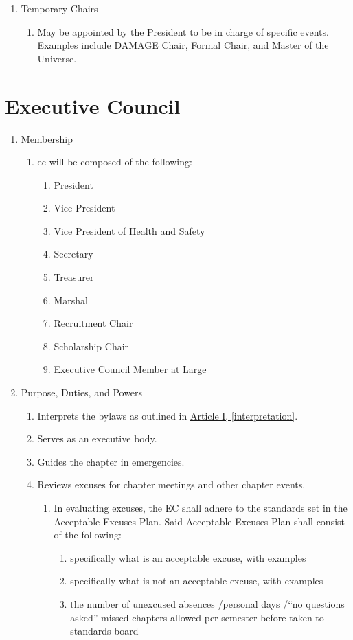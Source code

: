 \begin{enumerate}
		\item Temporary Chairs
			\begin{enumerate}
				\item May be appointed by the President to be in charge of specific events. Examples include DAMAGE Chair, Formal Chair, and Master of the Universe.
			\end{enumerate}

\end{enumerate}

\section{Executive Council}
	\begin{enumerate}
		\item Membership
			\begin{enumerate}
				\item \Gls{ec} will be composed of the following:
					\begin{enumerate}
						\item President
						\item Vice President
						\item Vice President of Health and Safety
						\item Secretary
						\item Treasurer
						\item Marshal
						\item Recruitment Chair
                        			\item Scholarship Chair
						\item Executive Council Member at Large
					\end{enumerate}

			\end{enumerate}

		\item Purpose, Duties, and Powers
			\begin{enumerate}
				\item Interprets the bylaws as outlined in \hyperref[interpretation]{Article I, \autoref*{interpretation}}.
				\item Serves as an executive body.
				\item Guides the chapter in emergencies.
				\item Reviews excuses for chapter meetings and other chapter events.
					\begin{enumerate}
					\item In evaluating excuses, the EC shall adhere to the standards set in the
					Acceptable Excuses Plan. Said Acceptable Excuses Plan shall consist of the following:
						\begin{enumerate}
							\item specifically what is an acceptable excuse, with examples
							\item specifically what is not an acceptable excuse, with examples
							\item the number of unexcused absences \slash personal days \slash “no questions asked” missed chapters allowed per semester before taken to standards board
						\end{enumerate}


\end{enumerate}
\end{enumerate}
\end{enumerate}
